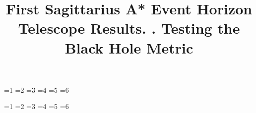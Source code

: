 \documentclass[twocolumn,twocolappendix,tighten,dvipsnames,linenumbers]{aastex63}
\begin{document}
%
\setcounter{iPap}{5}
\newcommand{\ehtsubtitle}{This is just the GAL for now}

\ifnum\value{iPap}=1 \renewcommand{\ehtsubtitle}{The Shadow of the Supermassive Black Hole in the Center of the Milky Way}\fi
\ifnum\value{iPap}=2 \renewcommand{\ehtsubtitle}{EHT and Multi-wavelength Observations, Data Processing, and Calibration}\fi
\ifnum\value{iPap}=3 \renewcommand{\ehtsubtitle}{Imaging of the Galactic Centre Supermassive Black Hole}\fi
\ifnum\value{iPap}=4 \renewcommand{\ehtsubtitle}{Variability, morphology, and black hole mass}\fi
\ifnum\value{iPap}=5 \renewcommand{\ehtsubtitle}{Testing Astrophysical Models of the Galactic Center Black Hole}\fi
\ifnum\value{iPap}=6 \renewcommand{\ehtsubtitle}{Testing the Black Hole Metric}\fi

\title{
First Sagittarius A* Event Horizon Telescope Results.
. \ehtsubtitle}



\ifnum\value{iPap}=1 \fi
\ifnum\value{iPap}=2 \fi
\ifnum\value{iPap}=3 \fi
\ifnum\value{iPap}=4 \fi
\ifnum\value{iPap}=5 \fi
\ifnum\value{iPap}=6 \fi


\received{\today}
\revised{\today}
\accepted{\today}
\end{document}
